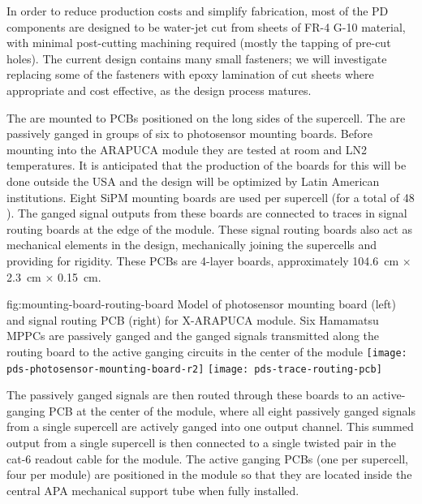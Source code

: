 In order to reduce production costs and simplify fabrication, most of the PD components are designed to be water-jet cut from sheets of FR-4 G-10 material, with minimal post-cutting machining required (mostly the tapping of pre-cut holes).  The current design contains many small fasteners; we will investigate replacing some of the fasteners with epoxy lamination of cut sheets where appropriate and cost effective, as the design process matures.

The  are mounted to PCBs positioned on the long sides of the supercell.  The  are passively ganged in groups of six to photosensor mounting boards. Before mounting into the ARAPUCA module they are tested at room and LN2 temperatures. It is anticipated that the production of the boards for   this will be done outside the USA and the design will be optimized by Latin American institutions. Eight SiPM mounting boards are used per supercell (for a total of 48 ).  The ganged signal outputs from these boards are connected to traces in signal routing boards at the edge of the module. These signal routing boards also act as mechanical elements in the design, mechanically joining the supercells and providing for rigidity.  These PCBs are 4-layer boards, approximately \SI{104.6}{cm} $\times$ \SI{2.3}{cm} $\times$ \SI{0.15}{cm}.

 \begin{dunefigure}
 {fig:mounting-board-routing-board}
{Model of photosensor mounting board (left) and signal routing PCB (right) for X-ARAPUCA module.  Six Hamamatsu MPPCs are passively ganged and the ganged signals transmitted along the routing board to the active ganging circuits in the center of the module}
  \texttt{[image: pds-photosensor-mounting-board-r2]}
  \texttt{[image: pds-trace-routing-pcb]}
\end{dunefigure}
The passively ganged signals are then routed through these boards to an active-ganging PCB at the center of the module, where all eight passively ganged signals from a single supercell are actively ganged into one output channel. This summed output from a single supercell is then connected to a single twisted pair in the cat-6 readout cable for the module.  The active ganging PCBs (one per supercell, four per module) are positioned in the module so that they are located inside the central APA mechanical support tube when fully installed.

